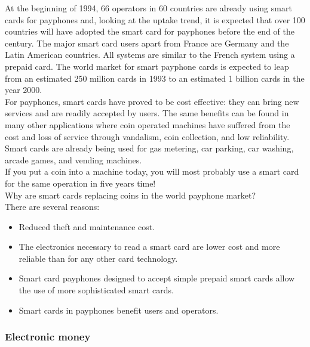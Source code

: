 \begin{htmllist}
    At the beginning of 1994, 66 operators in 60 countries are already
    using smart cards for payphones and, looking at the uptake trend, it is
    expected that over 100 countries will have adopted the smart card for
    payphones before the end of the century. The major smart card users
    apart from France are Germany and the Latin American countries. All
    systems are similar to the French system using a prepaid card. The
    world market for smart payphone cards is expected to leap from an
    estimated 250 million cards in 1993 to an estimated 1 billion cards in
    the year 2000.\\
    
    For payphones, smart cards have proved to be cost effective: they can
    bring new services and are readily accepted by users. The same benefits
    can be found in many other applications where coin operated machines
    have suffered from the cost and loss of service through vandalism, coin
    collection, and low reliability. Smart cards are already being used for
    gas metering, car parking, car washing, arcade games, and vending
    machines.\\
    
    If you put a coin into a machine today, you will most probably use a
    smart card for the same operation in five years time!\\
    
    Why are smart cards replacing coins in the world payphone market?\\
    
    There are several reasons:
    \begin{itemize}
      \item Reduced theft and maintenance cost.
      \item The electronics necessary to read a smart card are lower cost
        and more reliable than for any other card technology.
      \item Smart card payphones designed to accept simple prepaid smart
        cards allow the use of more sophisticated smart cards.
      \item Smart cards in payphones benefit users and operators.
    \end{itemize}
\end{htmllist}

\subsubsection{Electronic money}

